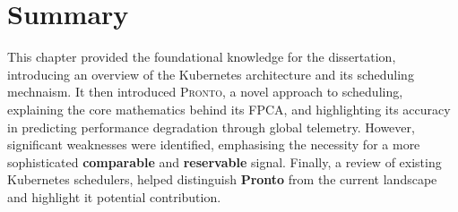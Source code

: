 \section{Summary}
This chapter provided the foundational knowledge for the dissertation,
introducing an overview of the Kubernetes architecture and its scheduling
mechnaism. It then introduced \textsc{Pronto}, a novel approach to scheduling,
explaining the core mathematics behind its FPCA, and highlighting its accuracy
in predicting performance degradation through global telemetry. However,
significant weaknesses were identified, emphasising the necessity for a more
sophisticated \textbf{comparable} and \textbf{reservable} signal. Finally, a
review of existing Kubernetes schedulers, helped distinguish \textbf{Pronto}
from the current landscape and highlight it potential contribution.


